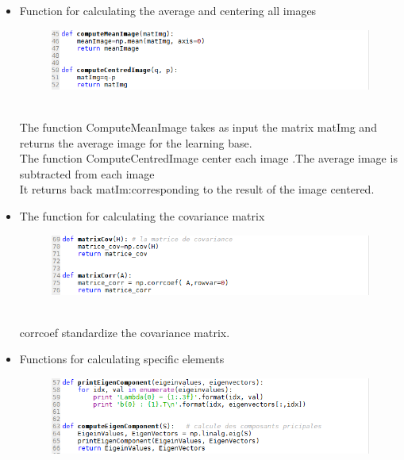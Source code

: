 \begin{itemize}
\paragraph{}
\item Function for calculating the average and centering all images
\begin{figure}[bth]%
\begin{center}
\includegraphics[scale=0.75]{fonc_mean_and_centred_img}%
\label{read_}%
\end {center}
\end{figure}
\\The function ComputeMeanImage takes as input the  matrix matImg and returns the average image for the  learning base.
\\ The function ComputeCentredImage center each image .The  average image is subtracted from each image
\\It returns back matIm:corresponding to the result of the image centered.
\item The function for calculating the covariance matrix
\begin{figure}[bth]%
\begin{center}
\includegraphics[scale=0.75]{fonc_matrix_cov_and_corr}%
\label{read_}%
\end {center}
\end{figure}
\\corrcoef  standardize the covariance matrix.
\newpage
\item Functions for calculating specific elements
\begin{figure}[bth]%
\begin{center}
\includegraphics[scale=0.75]{fonc_print_and_compute_eigenvector_eigenvalue}%

\end{center}
\end{figure}
\end{itemize}
